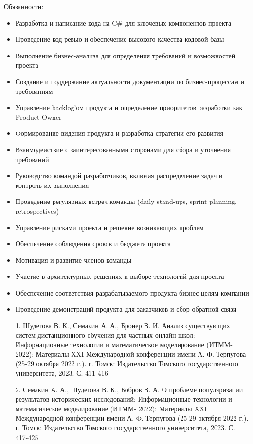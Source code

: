 \documentclass[10pt,a4paper,ragged2e,withhyper]{altacv}
\begin{document}
\divider

\textcolor{PastelRed}{Обязанности:}
\begin{itemize}
    \item Разработка и написание кода на C\# для ключевых компонентов проекта
    \item Проведение код-ревью и обеспечение высокого качества кодовой базы
    \item Выполнение бизнес-анализа для определения требований и возможностей проекта
    \item Создание и поддержание актуальности документации по бизнес-процессам и требованиям
    \item Управление backlog'ом продукта и определение приоритетов разработки как Product Owner
    \item Формирование видения продукта и разработка стратегии его развития
    \item Взаимодействие с заинтересованными сторонами для сбора и уточнения требований
    \item Руководство командой разработчиков, включая распределение задач и контроль их выполнения
    \item Проведение регулярных встреч команды (daily stand-ups, sprint planning, retrospectives)
    \item Управление рисками проекта и решение возникающих проблем
    \item Обеспечение соблюдения сроков и бюджета проекта
    \item Мотивация и развитие членов команды
    \item Участие в архитектурных решениях и выборе технологий для проекта
    \item Обеспечение соответствия разрабатываемого продукта бизнес-целям компании
    \item Проведение демонстраций продукта для заказчиков и сбор обратной связи
\end{itemize}

\begin{enumerate}
    \item[1.] Шудегова В. К., Семакин А. А., Бронер В. И. \textcolor{PastelRed}{Анализ существующих систем дистанционного обучения для частных онлайн школ}: Информационные технологии и математическое моделирование (ИТММ- 2022): Материалы XXI Международной конференции имени А. Ф. Терпугова (25-29 октября 2022 г.). г. Томск: Издательство Томского государственного университета, 2023. С. 411-416

    \item[2.] Семакин А. А., Шудегова В. К., Бобров В. А. \textcolor{PastelRed}{О проблеме популяризации результатов исторических исследований}:  Информационные технологии и математическое моделирование (ИТММ- 2022): Материалы XXI Международной конференции имени А. Ф. Терпугова (25-29 октября 2022 г.). г. Томск: Издательство Томского государственного университета, 2023. С. 417-425
\end{enumerate}
\end{document}
